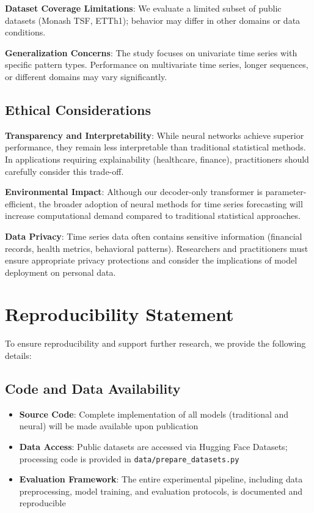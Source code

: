 \documentclass[11pt]{article}
\begin{document}
\textbf{Dataset Coverage Limitations}: We evaluate a limited subset of public datasets (Monash TSF, ETTh1); behavior may differ in other domains or data conditions.

\textbf{Generalization Concerns}: The study focuses on univariate time series with specific pattern types. Performance on multivariate time series, longer sequences, or different domains may vary significantly.

\subsection*{Ethical Considerations}

\textbf{Transparency and Interpretability}: While neural networks achieve superior performance, they remain less interpretable than traditional statistical methods. In applications requiring explainability (healthcare, finance), practitioners should carefully consider this trade-off.

\textbf{Environmental Impact}: Although our decoder-only transformer is parameter-efficient, the broader adoption of neural methods for time series forecasting will increase computational demand compared to traditional statistical approaches.

\textbf{Data Privacy}: Time series data often contains sensitive information (financial records, health metrics, behavioral patterns). Researchers and practitioners must ensure appropriate privacy protections and consider the implications of model deployment on personal data.

\section*{Reproducibility Statement}

To ensure reproducibility and support further research, we provide the following details:

\subsection*{Code and Data Availability}

\begin{itemize}
\item \textbf{Source Code}: Complete implementation of all models (traditional and neural) will be made available upon publication
\item \textbf{Data Access}: Public datasets are accessed via Hugging Face Datasets; processing code is provided in \texttt{data/prepare\_datasets.py}
\item \textbf{Evaluation Framework}: The entire experimental pipeline, including data preprocessing, model training, and evaluation protocols, is documented and reproducible
\end{itemize}
\end{document}
